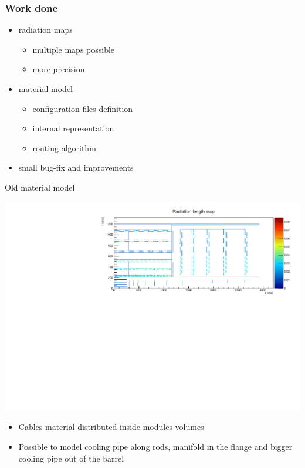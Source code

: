 \documentclass[pdftex, 11pt]{beamer}
\begin{document}

\begin{frame}
  \frametitle{Work done}
  \begin{itemize}
  \item \alert{radiation maps}
    \begin{itemize}
    \item multiple maps possible
    \item more precision
    \end{itemize}
  \item \alert{material} model
    \begin{itemize}
    \item configuration files definition
    \item internal representation
    \item routing algorithm
    \end{itemize}
  \item small bug-fix and improvements
  \end{itemize}
\end{frame}

\begin{frame}{Old material model}
  \begin{center}
    \includegraphics[width=\textwidth]{img/oldModel.pdf}
  \end{center}
  \begin{itemize}
  \item Cables material distributed \alert{inside} modules volumes
  \item Possible to model \alert{cooling pipe} along rods, \alert{manifold} in the flange and bigger cooling pipe out of the barrel
  \end{itemize}
\end{frame}
\end{document}
